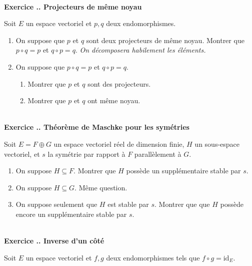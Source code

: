 \documentclass{article}
\newcounter{exo}
\newcommand{\exercice}[1][\null]{\textbf{\\ Exercice \thesection.\theexo. #1} \addtocounter{exo}{1}}
\begin{document}
\exercice[Projecteurs de même noyau]

Soit $E$ un espace vectoriel et $p,q$ deux endomorphismes.

\begin{enumerate}

\item On suppose que $p$ et $q$ sont deux projecteurs de même noyau. Montrer que $p \circ q = p$ et $q \circ p = q$. \emph{On décomposera habilement les éléments.}

\item On suppose que $p \circ q = p$ et $q \circ p = q$.

\begin{enumerate}

\item Montrer que $p$ et $q$ sont des projecteurs.

\item Montrer que $p$ et $q$ ont même noyau.

\end{enumerate}

\end{enumerate}



\exercice[Théorème de Maschke pour les symétries]

Soit $E =  F \oplus G$ un espace vectoriel réel de dimension finie, $H$ un sous-espace vectoriel, et $s$ la symétrie par rapport à $F$ parallèlement à $G$.

\begin{enumerate}

\item On suppose $H \subseteq F$. Montrer que $H$ possède un supplémentaire stable par $s$.

\item On suppose $H \subseteq G$. Même question.

\item On suppose seulement que $H$ est stable par $s$. Montrer que que $H$ possède encore un supplémentaire stable par $s$.

\end{enumerate}


\exercice[Inverse d'un côté]

Soit $E$ un espace vectoriel et $f,g$ deux endomorphismes tels que $f \circ g = \text{id}_{E}$.
\end{document}
